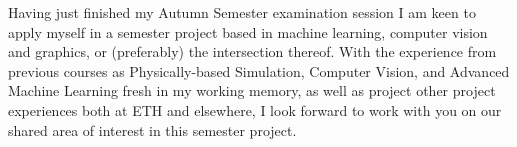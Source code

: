

\begin{cvparagraph}


Having just finished my Autumn Semester examination session I am keen to apply myself in a semester project based in machine learning, computer vision and graphics, or (preferably) the intersection thereof. With the experience from previous courses as Physically-based Simulation, Computer Vision, and Advanced Machine Learning fresh in my working memory, as well as project other project experiences both at ETH and elsewhere, I look forward to work with you on our shared area of interest in this semester project.
\end{cvparagraph}
